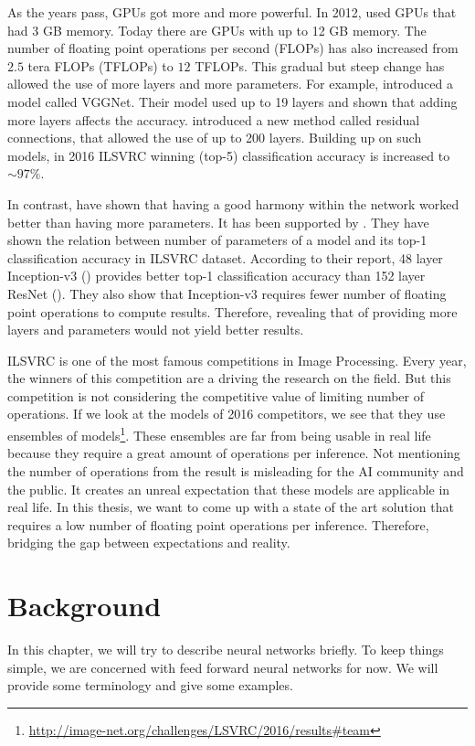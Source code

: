 As the years pass, GPUs got more and more powerful. In 2012, \cite{krizhevsky2012imagenet} used GPUs that had 3 GB memory. Today there are GPUs with up to 12 GB memory. The number of floating point operations per second (FLOPs) has also increased from $2.5$ tera FLOPs (TFLOPs) to $12$ TFLOPs. This gradual but steep change has allowed the use of more layers and more parameters. For example, \cite{Simonyan:2014aa} introduced a model called VGGNet. Their model used up to 19 layers and shown that adding more layers affects the accuracy. \cite{He:2015aa} introduced a new method called residual connections, that allowed the use of up to 200 layers. Building up on such models, in 2016 ILSVRC winning (top-5) classification accuracy is increased to $\sim 97\%$. 

In contrast, \cite{Szegedy:2014aa} have shown that having a good harmony within the network worked better than having more parameters. It has been supported by \cite{Canziani:2016aa}. They have shown the relation between number of parameters of a model and its top-1 classification accuracy in ILSVRC dataset. According to their report, 48 layer Inception-v3 (\cite{Szegedy_2016_CVPR}) provides better top-1 classification accuracy than 152 layer ResNet (\cite{He:2015aa}). They also show that Inception-v3 requires fewer number of floating point operations to compute results. Therefore, revealing that of providing more layers and parameters would not yield better results. 

ILSVRC is one of the most famous competitions in Image Processing. Every year, the winners of this competition are a driving the research on the field. But this competition is not considering the competitive value of limiting number of operations. If we look at the models of 2016 competitors, we see that they use ensembles of models\footnote{\url{http://image-net.org/challenges/LSVRC/2016/results\#team}}. These ensembles are far from being usable in real life because they require a great amount of operations per inference. Not mentioning the number of operations from the result is misleading for the AI community and the public. It creates an unreal expectation that these models are applicable in real life. In this thesis, we want to come up with a state of the art solution that requires a low number of floating point operations per inference. Therefore, bridging the gap between expectations and reality.

\section{Background}
In this chapter, we will try to describe neural networks briefly. To keep things simple, we are concerned with feed forward neural networks for now. We will provide some terminology and give some examples. 

